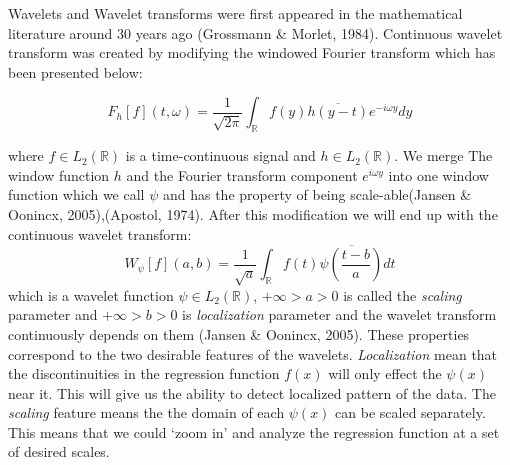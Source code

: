 \documentclass[12pt,twoside, a4paper]{reedthesis}
\begin{document}
Wavelets and Wavelet transforms were first appeared in the mathematical literature around 30 years ago (Grossmann \& Morlet, 1984). Continuous wavelet transform was created by modifying the windowed Fourier transform which has been presented below:

\[F_h[f](t,\omega)=\frac{1}{\sqrt{2\pi}}\int_{\mathbb{R}}f(y)\overline{h(y-t)}e^{-i\omega y}dy\]

where \(f\in L_2(\mathbb{R})\) is a time-continuous signal and \(h\in L_2(\mathbb{R})\). We merge The window function \(h\) and the Fourier transform component \(e^{i \omega y}\) into one window function which we call \(\psi\) and has the property of being scale-able(Jansen \& Oonincx, 2005),(Apostol, 1974). After this modification we will end up with the continuous wavelet transform:
\[W_\psi[f](a,b)=\frac{1}{\sqrt{a}}\int_{\mathbb{R}}f(t)\overline{\psi(\frac{t-b}{a})}dt\]
which is a wavelet function \(\psi \in L_2(\mathbb{R})\), \(+\infty>a>0\) is called the \emph{scaling} parameter and \(+\infty>b>0\) is \emph{localization} parameter and the wavelet transform continuously depends on them (Jansen \& Oonincx, 2005). These properties correspond to the two desirable features of the wavelets. \emph{Localization} mean that the discontinuities in the regression function \(f(x)\) will only effect the \(\psi(x)\) near it. This will give us the ability to detect localized pattern of the data. The \emph{scaling} feature means the the domain of each \(\psi(x)\) can be scaled separately. This means that we could `zoom in' and analyze the regression function at a set of desired scales.
\end{document}
